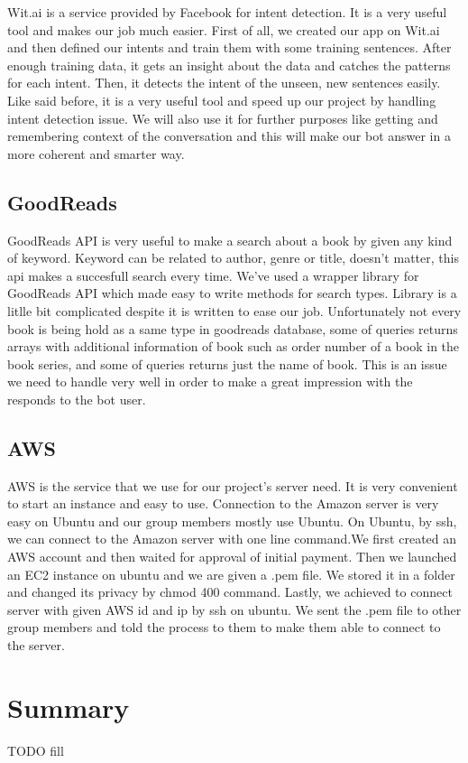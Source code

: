 \documentclass[a4paper]{article}
\begin{document}
\quad Wit.ai is a service provided by Facebook for intent detection. It is a very useful tool and makes our job much easier. First of all, we created our app on Wit.ai and then defined our intents and train them with some training sentences. After enough training data, it gets an insight about the data and catches the patterns for each intent. Then, it detects the intent of the unseen, new sentences easily. Like said before, it is a very useful tool and speed up our project by handling intent detection issue. We will also use it for further purposes like getting and remembering context of the conversation and this will make our bot answer in a more coherent and smarter way.
\subsection{GoodReads}

\quad GoodReads API is very useful to make a search about a book by given any kind of keyword. Keyword can be related to author, genre or title, doesn't matter, this api makes a succesfull search every time. We've used a wrapper library for GoodReads API which made easy to write methods for search types. Library is a litlle bit complicated despite it is written to ease our job. Unfortunately not every book is being hold as a same type in goodreads database, some of queries returns arrays with additional information of book such as order number of a book in the book series, and some of queries returns just the name of book. This is an issue we need to handle very well in order to make a great impression with the responds to the bot user.  
\subsection{AWS}

\quad AWS is the service that we use for our project's server need. It is very convenient to start an instance and easy to use. Connection to the Amazon server is very easy on Ubuntu and our group members mostly use Ubuntu. On Ubuntu, by ssh, we can connect to the Amazon server with one line command.We first created an AWS account and then waited for approval of initial payment. Then we launched an EC2 instance on ubuntu and we are given a .pem file. We stored it in a folder and changed its privacy by chmod 400 command. Lastly, we achieved to connect server with given AWS id and ip by ssh on ubuntu. We sent the .pem file to other group members and told the process to them to make them able to connect to the server.

\section{Summary}
TODO fill
\end{document}
